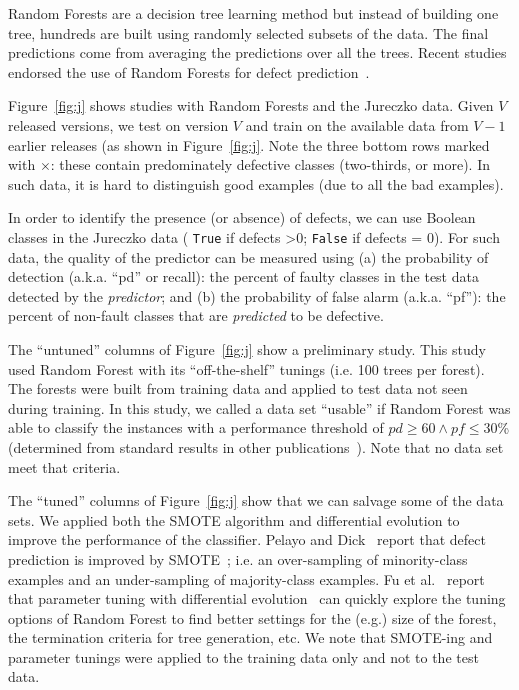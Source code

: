 \documentclass[twocolumn,5p]{elsarticle}
\newcommand{\fig}[1]{Figure~\ref{fig:#1}}
\theoremstyle{break}
\begin{document}
\begin{itemize}
  Random Forests are a decision tree learning method but
  instead of building one tree, hundreds are built using
  randomly selected subsets of the data. The final predictions
  come from averaging the predictions over all the trees.
  Recent studies endorsed the use
  of  Random Forests for  defect prediction~\cite{lessmann}.
  
\fig{j} shows   studies with Random Forests and
the Jureczko data. Given   $V$ released versions, we test on version $V$ and train on the available data from $V-1$ earlier releases (as shown in \fig{j}. Note the   \colorbox{lavenderpink}{three bottom rows}   marked with $\times$: these contain predominately defective classes (two-thirds, or more).  In such data, it is hard to distinguish good examples (due to all the bad examples). 

In order to identify the presence (or absence) of defects, we can   use Boolean classes in the  Jureczko data ( \texttt{True} if defects \textgreater 0; \texttt{False} if defects = 0). For such data, the quality of the predictor can be measured using (a) the  probability of detection (a.k.a. ``pd'' or recall):  the percent of faulty classes in the test data detected by the {\em predictor}; and (b) the  probability of false alarm (a.k.a. ``pf''): the percent of non-fault classes that are {\em predicted} to be defective.

The ``untuned'' columns of \fig{j}
show a preliminary study. This study used
Random Forest with its ``off-the-shelf'' tunings (i.e.  
100 trees per forest).  
The forests were built from training data and applied to test data
not seen during training.  In this
study, we called a data set ``usable'' if   Random Forest was able to classify the instances with a performance threshold of $\mathit{pd}\ge 60 \wedge \mathit{pf} \le 30$\% (determined from standard results in other publications~\cite{me07b}). Note that no  data set meet
that criteria.

The ``tuned'' columns of \fig{j} show that we can salvage some of the data sets. We applied both the SMOTE algorithm and differential evolution to improve the performance of the classifier. Pelayo and Dick~\cite{pelayo07} report that defect prediction is improved by SMOTE~\cite{Chawla2002}; i.e. an over-sampling of minority-class examples and an under-sampling of majority-class examples. Fu et al.~\cite{fu:ase15} report that parameter tuning with differential evolution~\cite{storn97} can quickly explore the tuning options of Random Forest to find better settings for the (e.g.) size of the forest, the termination criteria
for tree generation, etc. We note that SMOTE-ing and
parameter tunings were applied to the training data only and not to the test data.


\end{itemize}
\end{document}
